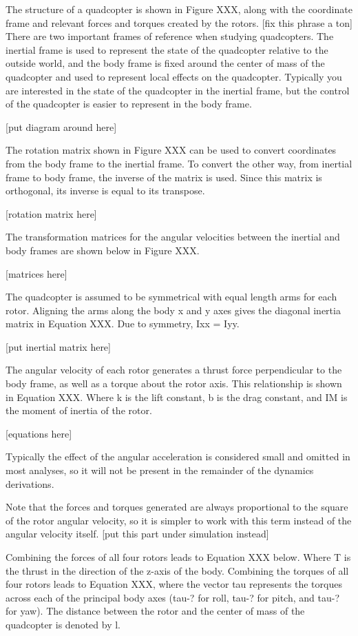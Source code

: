 \documentclass[letterpaper,12pt,titlepage,oneside,final]{book}
\begin{document}
The structure of a quadcopter is shown in Figure XXX, along with the coordinate frame and relevant forces and torques created by the rotors.
[fix this phrase a ton] There are two important frames of reference when studying quadcopters. The inertial frame is used to represent the state of the quadcopter relative to the outside world, and the body frame is fixed around the center of mass of the quadcopter and used to represent local effects on the quadcopter.
Typically you are interested in the state of the quadcopter in the inertial frame, but the control of the quadcopter is easier to represent in the body frame. 

[put diagram around here]

The rotation matrix shown in Figure XXX can be used to convert coordinates from the body frame to the inertial frame. To convert the other way, from inertial frame to body frame, the inverse of the matrix is used. Since this matrix is orthogonal, its inverse is equal to its transpose.

[rotation matrix here]

The transformation matrices for the angular velocities between the inertial and body frames are shown below in Figure XXX.

[matrices here]

The quadcopter is assumed to be symmetrical with equal length arms for each rotor. Aligning the arms along the body x and y axes gives the diagonal inertia matrix in Equation XXX. Due to symmetry, Ixx = Iyy.

[put inertial matrix here]

The angular velocity of each rotor generates a thrust force perpendicular to the body frame, as well as a torque about the rotor axis. This relationship is shown in Equation XXX. Where k is the lift constant, b is the drag constant, and IM is the moment of inertia of the rotor.

[equations here]

Typically the effect of the angular acceleration is considered small and omitted in most analyses, so it will not be present in the remainder of the dynamics derivations.

Note that the forces and torques generated are always proportional to the square of the rotor angular velocity, so it is simpler to work with this term instead of the angular velocity itself. [put this part under simulation instead]

Combining the forces of all four rotors leads to Equation XXX below. Where T is the thrust in the direction of the z-axis of the body. Combining the torques of all four rotors leads to Equation XXX, where the vector tau represents the torques across each of the principal body axes (tau-? for roll, tau-? for pitch, and tau-? for yaw). The distance between the rotor and the center of mass of the quadcopter is denoted by l. 
\end{document}
